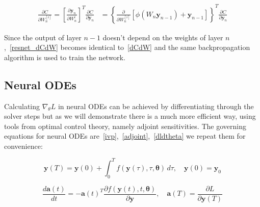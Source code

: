 \documentclass{article}
\begin{document}
    \begin{align}
        \frac{ \partial C}{\partial W_n^{[i]} }
        =
        \left[ \frac{ \partial \pmb{y}_{n}}{\partial W_n^i } \right]^T
        \frac{ \partial C}{\partial \pmb{y}_{n} }
        &=
        \left\{
        \frac{ \partial }{\partial W_n^{[i]} }
        \left[
            \phi( W_{n} \bm{y}_{n-1} )  + \textbf{y}_{n-1}
            \right]
        \right\}^T
        \frac{ \partial C}{\partial \pmb{y}_{n} }
        \label{resnet_dCdW}
    \end{align}

    Since the output of layer $n-1$ doesn't depend on the weights of layer $n$,~\eqref{resnet_dCdW} becomes identical to~\eqref{dCdW} and the same backpropagation algorithm is used to train the network.


    \subsection{Neural ODEs}
    Calculating $\nabla_{\theta}L$ in neural ODEs can be achieved by differentiating through the solver steps but as we will demonstrate there is a much more efficient way, using tools from optimal control theory, namely adjoint sensitivities.
    The governing equations for neural ODEs are~\eqref{ivp},~\eqref{adjoint},~\eqref{dldtheta} we repeat them for convenience:

    \begin{equation*}
        \pmb{y}(T) =  \pmb{y}(0) +\int_{0}^{T} f(\pmb{y}(\tau), \tau, \pmb{\theta}) \,d\tau
        , \quad
        \pmb{y}(0) = \pmb{y}_0
    \end{equation*}

    \begin{equation*}
        \frac
        {d \pmb{a}(t)}
        {dt}
        =
        - \pmb{a}(t)^T
        \frac
        {\partial f( \pmb{y}(t), t, \pmb{\theta} )}
        {\partial \pmb{y} }
        , \quad
        \pmb{a}(T) = \frac{\partial L}{\partial \pmb{y}(T)}
    \end{equation*}
\end{document}
